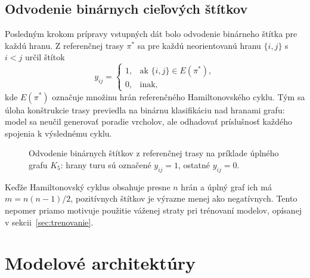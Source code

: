 \subsection{Odvodenie binárnych cieľových štítkov}
\label{sec:cielove_stitky}

\indent Posledným krokom prípravy vstupných dát bolo odvodenie binárneho
štítka pre každú hranu. Z referenčnej trasy \(\pi^*\) sa pre každú
neorientovanú hranu \(\{i,j\}\) s \(i < j\) určil štítok
\begin{equation}
y_{ij} =
\begin{cases}
1, & \text{ak } \{i,j\} \in E(\pi^*), \\
0, & \text{inak,}
\end{cases}
\label{eq:edge_label}
\end{equation}
kde \(E(\pi^*)\) označuje množinu hrán referenčného Hamiltonovského
cyklu. Tým sa úloha konštrukcie trasy previedla na binárnu klasifikáciu
nad hranami grafu: model sa neučil generovať poradie vrcholov, ale
odhadovať príslušnosť každého spojenia k výslednému cyklu.

\begin{symboltable}
\end{symboltable}

\begin{figure}[H]
    \centering
    \resizebox{0.72\textwidth}{!}{}
    \caption{Odvodenie binárnych štítkov z referenčnej trasy na príklade
             úplného grafu \(K_5\): hrany turu sú označené \(y_{ij}=1\),
             ostatné \(y_{ij}=0\).}
    \label{fig:edge_label_derivation}
\end{figure}

\indent Keďže Hamiltonovský cyklus obsahuje presne \(n\) hrán a úplný
graf ich má \(m = n(n-1)/2\), pozitívnych štítkov je výrazne menej ako
negatívnych. Tento nepomer priamo motivuje použitie váženej straty pri
trénovaní modelov, opísanej v sekcii~\ref{sec:trenovanie}.

\section{Modelové architektúry}
\label{sec:modelove_architektury}

